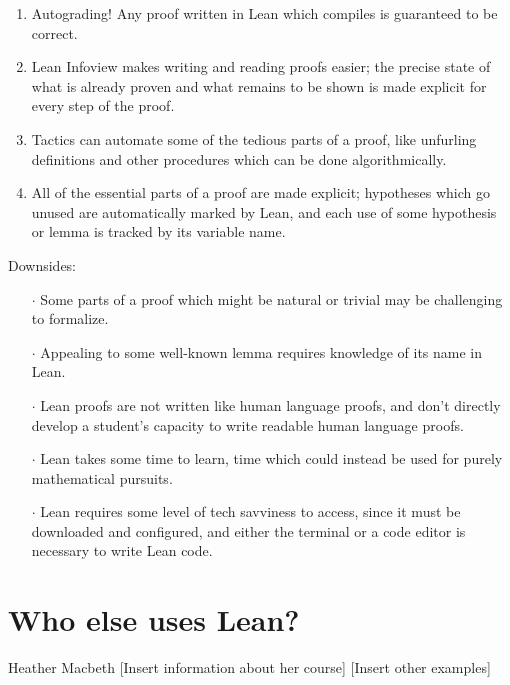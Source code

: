 \begin{enumerate}
    \item
Autograding! Any proof written in Lean which compiles is 
guaranteed to be correct.
    \item
Lean Infoview makes writing and reading proofs easier; the precise 
state of what is already proven and what remains to be shown is 
made explicit for every step of the proof.
    \item 
Tactics can automate some of the tedious parts of a proof, like 
unfurling definitions and other procedures which can be done 
algorithmically.
    \item
All of the essential parts of a proof are made explicit; 
hypotheses which go unused are automatically marked by Lean, 
and each use of some hypothesis or lemma is tracked by its 
variable name. 
\end{enumerate}
Downsides: 
\begin{enumerate}
    \item[$\cdot$]
Some parts of a proof which might be natural or trivial may be 
challenging to formalize.
    \item[$\cdot$]
Appealing to some well-known lemma requires knowledge 
of its name in Lean.
    \item[$\cdot$]
Lean proofs are not written like human language proofs, 
and don’t directly develop a student’s capacity to write 
readable human language proofs.
    \item[$\cdot$]
Lean takes some time to learn, time which could instead be used 
for purely mathematical pursuits.
    \item[$\cdot$]
Lean requires some level of tech savviness to access, 
since it must be downloaded and configured, and either the 
terminal or a code editor is necessary to write Lean code. 
\end{enumerate}
\section{Who else uses Lean?}
Heather Macbeth
[Insert information about her course]
[Insert other examples]